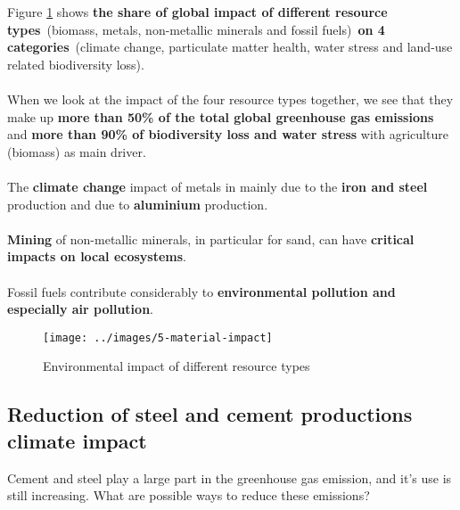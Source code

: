 \documentclass[../summary.tex]{subfiles}
\begin{document}
	Figure \ref{fig:5-material-impact} shows \textbf{the share of global impact of different resource types} (biomass, metals, non-metallic minerals and fossil fuels) \textbf{on 4 categories} (climate change, particulate matter health, water stress and land-use related biodiversity loss). 
	\\\\
	When we look at the impact of the four resource types together, we see that they make up \textbf{more than 50\% of the total global greenhouse gas emissions} and \textbf{more than 90\% of biodiversity loss and water stress} with agriculture (biomass) as main driver.
	\\\\
	The \textbf{climate change} impact of metals in mainly due to the \textbf{iron and steel} production and due to \textbf{aluminium} production.
	\\
	\\
	\textbf{Mining} of non-metallic minerals, in particular for sand, can have \textbf{critical impacts on local ecosystems}.
	\\
	\\
	Fossil fuels contribute considerably to \textbf{environmental pollution and especially air pollution}.
	
	\begin{figure}[H]
		\centering
		\texttt{[image: ../images/5-material-impact]}
		\caption{Environmental impact of different resource types}
		\label{fig:5-material-impact}
	\end{figure}
	\newpage
	
	\subsection{Reduction of steel and cement productions climate impact}
	
	Cement and steel play a large part in the greenhouse gas emission, and it’s use is still increasing. What are possible ways to reduce these emissions?
	
\end{document}
